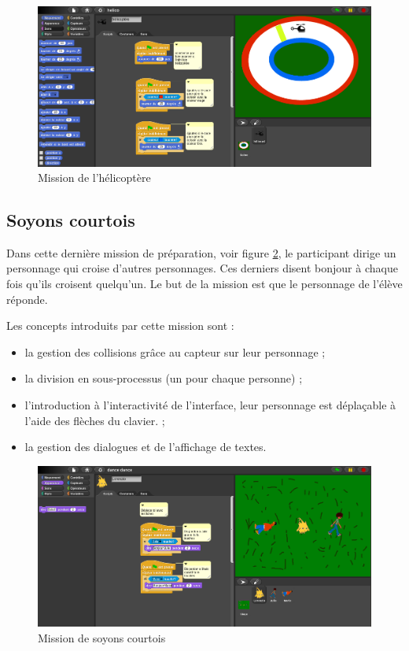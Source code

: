 \begin{figure}
  \begin{center}
    \includegraphics[width=\textwidth]{content/7-solution/1-missions/images/helicoptere}
    \caption{Mission de l'hélicoptère}
    \label{fig:mission-hélicoptère}
  \end{center}
\end{figure}

\subsection{Soyons courtois}
\label{mission-courtois}
Dans cette dernière \gls{mission} de préparation, voir figure \ref{fig:courtois}, le participant dirige un personnage qui croise d'autres personnages. Ces derniers disent bonjour à chaque fois qu'ils croisent quelqu'un. Le but de la \gls{mission} est que le personnage de l'élève réponde.

Les concepts introduits par cette \gls{mission} sont :
\begin{itemize}
\item la gestion des collisions grâce au capteur sur leur personnage ;
\item la division en sous-processus (un pour chaque personne) ;
\item l'introduction à l'interactivité de l'interface, leur personnage est déplaçable à l'aide des flèches du clavier. ;
\item la gestion des dialogues et de l'affichage de textes.
\end{itemize}

\begin{figure}
  \begin{center}
    \includegraphics[width=\textwidth]{content/7-solution/1-missions/images/courtois}
    \caption{Mission de soyons courtois}
    \label{fig:courtois}
  \end{center}
\end{figure}

